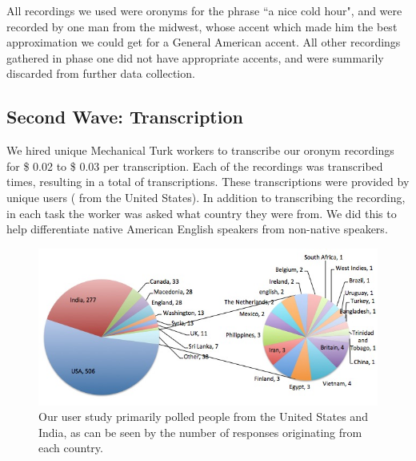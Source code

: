 All \recordingsPhaseTwoUserStudy recordings we used were oronyms for the phrase ``a nice cold hour", and were recorded by one man from the midwest, whose accent which made him the best approximation we could get for a General American accent. All other recordings gathered in phase one did not have appropriate accents, and were summarily discarded from further data collection.

\subsection{Second Wave: Transcription}
\label{subsection:secondWaveUserStudy}

We hired \uniqueUsersPhaseTwoUserStudy unique Mechanical Turk workers to transcribe our oronym recordings for \$ 0.02 to \$ 0.03 per transcription.  Each of the \recordingsPhaseTwoUserStudy recordings was transcribed \numTranscriptionsPerRecordingPhaseTwoUserStudy times, resulting in a total of \numResponsesPhaseTwoUserStudy transcriptions. These transcriptions were provided by \uniqueUsersPhaseTwoUserStudy unique users ( \uniqueUsersPhaseTwoUserStudyUSA from the United States). In addition to transcribing the recording, in each task the worker was asked what country they were from. We did this to help differentiate native American English speakers from non-native speakers.

\begin{figure}
\includegraphics[width=150mm]{responsesPerCountry.jpg}
\captionfonts
\caption[Responses Per Country]{ Our user study primarily polled people from the United States and India, as can be seen by the number of responses originating from each country. }
\label{fig:responsesPerCountry}
\end{figure}



